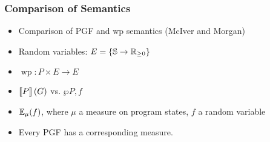 \begin{frame}
	\frametitle{Comparison of Semantics}
		\begin{itemize}[<+->]
			\itemspacing{7pt}
			\item Comparison of PGF and wp semantics (McIver and Morgan)
			\item Random variables: $ E = \{ \mathbb{S} \to \mathbb{R}_{\geq 0} \}$
			\item $ \operatorname{wp} \colon P \times E \to E $
			\item $ \left\llbracket P \right\rrbracket(G) $ vs. $ \wp{P, f} $
			\item $ \mathbb{E}_\mu (f) $, where $\mu$ a measure on program states, $f$ a random variable
			\item Every PGF has a corresponding measure.
		\end{itemize}
\end{frame}